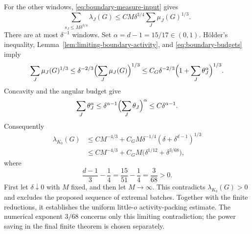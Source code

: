 For the other windows, \eqref{eq:boundary-measure-input} gives
\[
 \sum_{s_J\leq M\delta^{3/4}}\lambda_J(G)
 \leq C M\delta^{3/4}\sum_J\mu_J(G)^{1/3}.
\]
There are at most $\delta^{-1}$ windows. Set
$\alpha=d-1=15/17\in(0,1)$. H\"older's inequality,
Lemma~\ref{lem:limiting-boundary-activity}, and
\eqref{eq:boundary-budgets} imply
\[
 \sum_J\mu_J(G)^{1/3}
 \leq \delta^{-2/3}\Bigl(\sum_J\mu_J(G)\Bigr)^{1/3}
 \leq C_G\delta^{-2/3}
       \Bigl(1+\sum_J\theta_J^\alpha\Bigr)^{1/3}.
\]
Concavity and the angular budget give
\[
 \sum_J\theta_J^\alpha
 \leq \delta^{\alpha-1}\Bigl(\sum_J\theta_J\Bigr)^\alpha
 \leq C\delta^{\alpha-1}.
\]
Consequently
\begin{align*}
 \lambda_{K_0}(G)
 &\leq C M^{-4/3}
      +C_G M\delta^{-1/4}(\delta+\delta^{d-1})^{1/3}\\
 &\leq C M^{-4/3}
      +C_G M\bigl(\delta^{1/12}+\delta^{3/68}\bigr),
\end{align*}
where
\[
 \frac{d-1}{3}-\frac14
 =\frac{15}{51}-\frac14=\frac{3}{68}>0.
\]
First let $\delta\downarrow0$ with $M$ fixed, and then let
$M\to\infty$. This contradicts $\lambda_{K_0}(G)>0$ and excludes
the proposed sequence of extremal batches. Together with the finite
reductions, it establishes the uniform little-$o$ activity-packing
estimate. The numerical exponent $3/68$ concerns only this limiting
contradiction; the power saving in the final finite theorem is chosen
separately.
